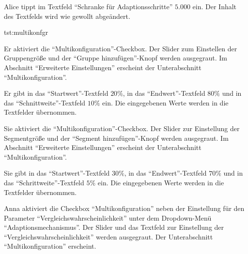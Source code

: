 \documentclass[parskip=full,11pt]{scrartcl}
\begin{document}
{Alice tippt im Textfeld \enquote{Schranke für Adaptionsschritte} \(5.000\) ein.}
{Der Inhalt des Textfelds wird wie gewollt abgeändert.}

{tst:multikonfgr}

{Er aktiviert die \enquote{Multikonfiguration}-Checkbox.}
{Der Slider zum Einstellen der Gruppengröße und der \enquote{Gruppe hinzufügen}-Knopf werden ausgegraut. Im Abschnitt \enquote{Erweiterte Einstellungen} erscheint der Unterabschnitt \enquote{Multikonfiguration}.}

{Er gibt in das \enquote{Startwert}-Textfeld \(20\%\), in das \enquote{Endwert}-Textfeld \(80\%\) und in das \enquote{Schnittweite}-Textfeld \(10\%\) ein.}
{Die eingegebenen Werte werden in die Textfelder übernommen.}

{Sie aktiviert die \enquote{Multikonfiguration}-Checkbox.}
{Der Slider zur Einstellung der Segmentgröße und der \enquote{Segment hinzufügen}-Knopf werden ausgegraut. Im Abschnitt \enquote{Erweiterte Einstellungen} erscheint der Unterabschnitt \enquote{Multikonfiguration}.}

{Sie gibt in das \enquote{Startwert}-Textfeld \(30\%\), in das \enquote{Endwert}-Textfeld \(70\%\) und in das \enquote{Schrittweite}-Textfeld \(5\%\) ein.}
{Die eingegebenen Werte werden in die Textfelder übernommen.}

{Anna aktiviert die Checkbox \enquote{Multikonfiguration} neben der Einstellung für den Parameter \enquote{Vergleichswahrscheinlichkeit} unter dem Dropdown-Menü \enquote{Adaptionsmechanismus}.}
{Der Slider und das Textfeld zur Einstellung der \enquote{Vergleichswahrscheinlichkeit} werden ausgegraut. Der Unterabschnitt \enquote{Multikonfiguration} erscheint.}
\end{document}
